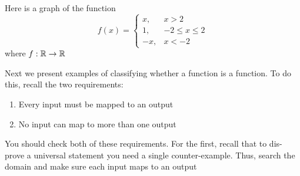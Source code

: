 \documentclass[main.tex]{subfiles}
\begin{document}
\begin{example}
	Here is a graph of the function \[f(x) = \begin{cases} x, & x > 2 \\ 1, & -2 \leq x \leq 2 \\ -x, & x < -2 \end{cases}\] where \(f : \mathbb{R} \rightarrow \mathbb{R}\)
	
	\begin{center}
	\end{center}
\end{example}

Next we present examples of classifying whether a function is a function. To do this, recall the two requirements:
\begin{enumerate}
	\item Every input must be mapped to an output
	\item No input can map to more than one output
\end{enumerate}
You should check both of these requirements. For the first, recall that to dis-prove a universal statement you need a single counter-example. Thus, search the domain and make sure each input maps to an output
\end{document}
